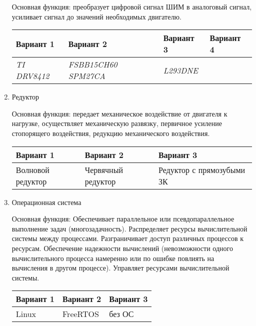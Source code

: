\begin{enumerate}
        Основная функция: преобразует цифровой сигнал ШИМ в аналоговый сигнал,
        усиливает сигнал до значений необходимых двигателю.

        \begin{tabular}{|p{3.5cm}|p{3.5cm}|p{3.5cm}|p{3.5cm}|}
            \hline
            Вариант 1 & Вариант 2 & Вариант 3 & Вариант 4 \\
            \hline
            \textit{TI DRV8412} &
            \textit{FSBB15CH60 SPM27CA} &
            \textit{L293DNE} \\
            \hline
        \end{tabular}

    \item Редуктор

        Основная функция: передает механическое воздействие от двигателя к
        нагрузке, осуществляет механическую развязку, первичное усиление
        стопорящего воздействия, редукцию механического воздействия.

        \begin{tabular}{|p{3.5cm}|p{3.5cm}|p{3.5cm}|}
            \hline
            Вариант 1 & Вариант 2 & Вариант 3 \\
            \hline
            Волновой редуктор &
            Червячный редуктор &
            Редуктор с прямозубыми ЗК \\
            \hline
        \end{tabular}

    \item Операционная система

        Основная функция: Обеспечивает параллельное или псевдопараллельное
        выполнение задач (многозадачность). Распределяет ресурсы вычислительной
        системы между процессами. Разграничивает доступ различных процессов к
        ресурсам. Обеспечение надежности вычислений (невозможности одного
        вычислительного процесса намеренно или по ошибке повлиять на вычисления
        в другом процессе). Управляет ресурсами вычислительной системы.

        \begin{tabular}{|p{3.5cm}|p{3.5cm}|p{3.5cm}|}
            \hline
            Вариант 1 & Вариант 2 & Вариант 3 \\
            \hline
            Linux &
            FreeRTOS &
            без ОС \\
            \hline
        \end{tabular}
\end{enumerate}


